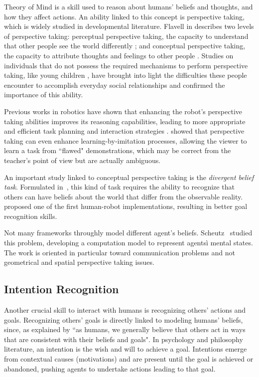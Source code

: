 Theory of Mind \cite{premack1978does} is a skill used to reason about humans' beliefs and thoughts, and how they affect actions. An ability linked to this concept is perspective taking, which is widely studied in developmental literature.  Flavell in \cite{flavell1977development} describes two levels of perspective taking: 
perceptual perspective taking, the capacity to understand that other people see the world differently \cite{Tversky1999}; and conceptual perspective taking, the capacity to attribute thoughts and feelings to other people \cite{Baron1985}. Studies on individuals that do not possess the required mechanisms to perform perspective taking, like young children \cite{frick2014picturing}, have brought into light the difficulties these people encounter to accomplish everyday social relationships and confirmed the importance of this ability.

Previous works in robotics have shown that enhancing the robot's perspective taking abilities improves its reasoning capabilities, leading to more appropriate and efficient task planning and interaction strategies \cite{Trafton2005,ros2010one}. \cite{breazeal2006} showed that perspective taking can even enhance learning-by-imitation processes, allowing the viewer to learn a task from ``flawed" demonstrations, which may be correct from the teacher's point of view but are actually ambiguous. 

An important study linked to conceptual perspective taking is the \textit{divergent belief task}.  Formulated in~\cite{wimmer1983}, this kind of task requires the ability to recognize that others can have beliefs about the world that differ from the observable reality. \cite{BreazealGB09} proposed one of the first human-robot implementations, resulting in better goal recognition skills. 

Not many frameworks throughly model different agent's beliefs.  Scheutz~\cite{scheutz2013computational} studied this problem, developing a computation model to represent agentsì mental states. The work is oriented in particular toward communication problems and not geometrical and spatial perspective taking issues.

\subsection{Intention Recognition}
Another crucial skill to interact with humans is recognizing others' actions and goals. Recognizing others' goals is directly linked to modeling humans' beliefs, since, as explained by \cite{byom2013theory} ``as humans, we generally believe that others act in ways that are consistent with their beliefs and goals". In psychology \cite{bruner1981} and philosophy \cite{bratman1984} literature, an intention is the wish and will to achieve a goal. Intentions emerge from contextual causes (motivations) and are present until the goal is achieved or abandoned, pushing agents to undertake actions leading to that goal.


